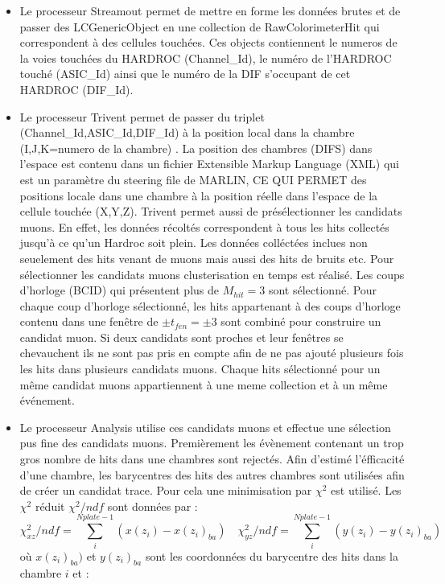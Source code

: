 \begin{itemize}[label=$\bullet$]
	\item Le processeur Streamout permet de mettre en forme les données brutes et de passer des LCGenericObject en une collection de RawColorimeterHit qui correspondent à des cellules touchées. Ces objects contiennent le numeros de la voies touchées du HARDROC (Channel\_Id), le numéro de l'HARDROC touché (ASIC\_Id) ainsi que le numéro de la DIF s'occupant de cet HARDROC (DIF\_Id).
	\item Le processeur Trivent permet de passer du triplet (Channel\_Id,ASIC\_Id,DIF\_Id) à la position local dans la chambre (I,J,K=numero de la chambre) . La position des chambres (DIFS) dans l'espace est contenu dans un fichier Extensible Markup Language (XML) qui est un paramètre du steering file de MARLIN, CE QUI PERMET des positions locale dans une chambre à la position réelle dans l'espace de la cellule touchée (X,Y,Z). Trivent permet aussi de présélectionner les candidats muons. En effet, les données récoltés correspondent à tous les hits collectés jusqu'à ce qu'un Hardroc soit plein. Les données colléctées inclues non seuelement des hits venant de muons mais aussi des hits de bruits etc. Pour sélectionner les candidats muons clusterisation en temps est réalisé. Les coups d'horloge (BCID) qui présentent plus de $M_{hit}=3$ sont sélectionné. Pour chaque coup d'horloge sélectionné, les hits appartenant à des coups d'horloge contenu dans une fenêtre de $\pm t_{fen}=\pm3$ sont combiné pour construire un candidat muon. Si deux candidats sont proches et leur fenêtres se chevauchent ils ne sont pas pris en compte afin de ne pas ajouté plusieurs fois les hits dans plusieurs candidats muons. Chaque hits sélectionné pour un même candidat muons appartiennent à une meme collection et à un même événement.
	\item Le processeur Analysis utilise ces candidats muons et effectue une sélection pus fine des candidats muons. Premièrement les évènement contenant un trop gros nombre de hits dans une chambres sont rejectés. Afin d'estimé l'éfficacité d'une chambre, les barycentres des hits des autres chambres sont utilisées afin de créer un candidat trace. Pour cela une minimisation par $\chi^2$ est utilisé. Les $\chi^2$ réduit $\chi^2/ndf$ sont données par :
	\begin{equation}
	\chi_{xz}^2/ndf=\sum_i^{Nplate-1}(x(z_{i})-x(z_{i})_{ba}) \quad \chi_{yz}^2/ndf=\sum_i^{Nplate-1}(y(z_{i})-y(z_{i})_{ba})
	\end{equation}
	où $x(z_{i})_{ba})$ et $y(z_{i})_{ba}$ sont les coordonnées du barycentre des hits dans la chambre $i$ et :

\end{itemize}
